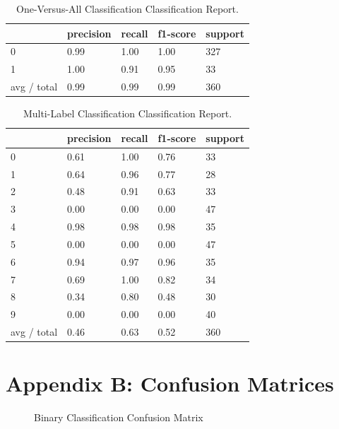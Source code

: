 \documentclass[]{article}
\begin{document}
\begin{table}[h]
	\begin{tabular}{l|llll}
		& precision & recall & f1-score & support \\ \hline
		0 & 0.99 & 1.00 & 1.00 & 327 \\
		1 & 1.00 & 0.91 & 0.95 & 33  \\
		avg / total & 0.99 & 0.99 & 0.99 & 360 
	\end{tabular}
	\caption{One-Versus-All Classification Classification Report.}
\end{table}

\begin{table}[h]
	\begin{tabular}{l|llll}
		& precision & recall & f1-score & support \\ \hline
		0 & 0.61 & 1.00 & 0.76 & 33 \\
		1 & 0.64 & 0.96 & 0.77 & 28 \\
		2 & 0.48 & 0.91 & 0.63 & 33 \\
		3 & 0.00 & 0.00 & 0.00 & 47 \\
		4 & 0.98 & 0.98 & 0.98 & 35 \\
		5 & 0.00 & 0.00 & 0.00 & 47 \\
		6 & 0.94 & 0.97 & 0.96 & 35 \\
		7 & 0.69 & 1.00 & 0.82 & 34 \\
		8 & 0.34 & 0.80 & 0.48 & 30 \\
		9 & 0.00 & 0.00 & 0.00 & 40 \\
		avg / total & 0.46 & 0.63 & 0.52 & 360
	\end{tabular}
	\caption{Multi-Label Classification Classification Report.}
\end{table}

\newpage
\section{Appendix B: Confusion Matrices}

\begin{figure}[h!]
	\centering
	\caption{Binary Classification Confusion Matrix}
\end{figure}
\end{document}
